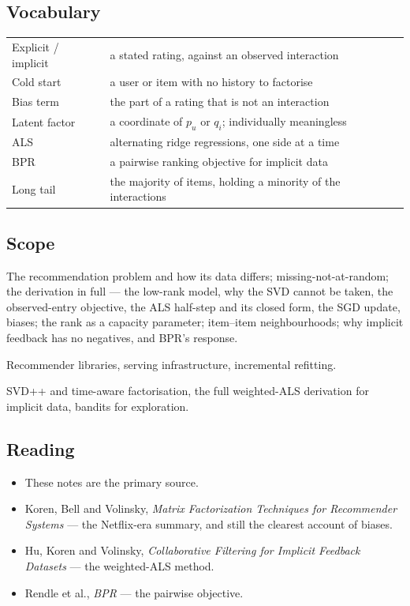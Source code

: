 \documentclass[11pt,a4paper]{article}
\begin{document}
\subsection{Vocabulary}

\begin{center}
\small
\begin{tabular}{ll}
\toprule
Explicit / implicit & a stated rating, against an observed interaction \\
Cold start          & a user or item with no history to factorise \\
Bias term           & the part of a rating that is not an interaction \\
Latent factor       & a coordinate of $p_u$ or $q_i$; individually meaningless \\
ALS                 & alternating ridge regressions, one side at a time \\
BPR                 & a pairwise ranking objective for implicit data \\
Long tail           & the majority of items, holding a minority of the interactions \\
\bottomrule
\end{tabular}
\end{center}

\subsection{Scope}

 The recommendation problem and how its data differs;
missing-not-at-random; the derivation in full --- the low-rank model, why the
SVD cannot be taken, the observed-entry objective, the ALS half-step and its
closed form, the SGD update, biases; the rank as a capacity parameter;
item--item neighbourhoods; why implicit feedback has no negatives, and BPR's
response.

 Recommender libraries, serving
infrastructure, incremental refitting.

 SVD++ and time-aware factorisation, the full
weighted-ALS derivation for implicit data, bandits for exploration.

\subsection{Reading}

\begin{itemize}[leftmargin=*,nosep]
  \item These notes are the primary source.
  \item Koren, Bell and Volinsky, \emph{Matrix Factorization Techniques for
        Recommender Systems} --- the Netflix-era summary, and still the
        clearest account of biases.
  \item Hu, Koren and Volinsky, \emph{Collaborative Filtering for Implicit
        Feedback Datasets} --- the weighted-ALS method.
  \item Rendle et al., \emph{BPR} --- the pairwise objective.
\end{itemize}
\end{document}
